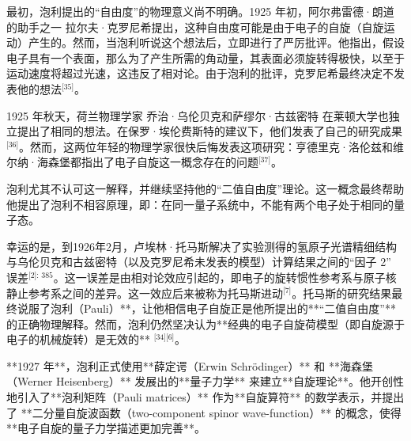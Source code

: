 最初，泡利提出的“自由度”的物理意义尚不明确。1925 年初，阿尔弗雷德·朗道的助手之一 拉尔夫·克罗尼希提出，这种自由度可能是由于电子的自旋（自旋运动）产生的。然而，当泡利听说这个想法后，立即进行了严厉批评。他指出，假设电子具有一个表面，那么为了产生所需的角动量，其表面必须旋转得极快，以至于运动速度将超过光速，这违反了相对论。由于泡利的批评，克罗尼希最终决定不发表他的想法\(^\text{[35]}\)。

1925 年秋天，荷兰物理学家 乔治·乌伦贝克和萨缪尔·古兹密特 在莱顿大学也独立提出了相同的想法。在保罗·埃伦费斯特的建议下，他们发表了自己的研究成果\(^\text{[36]}\)。然而，这两位年轻的物理学家很快后悔发表这项研究：亨德里克·洛伦兹和维尔纳·海森堡都指出了电子自旋这一概念存在的问题\(^\text{[37]}\)。  

泡利尤其不认可这一解释，并继续坚持他的“二值自由度”理论。这一概念最终帮助他提出了泡利不相容原理，即：在同一量子系统中，不能有两个电子处于相同的量子态。

幸运的是，到1926年2月，卢埃林·托马斯解决了实验测得的氢原子光谱精细结构与乌伦贝克和古兹密特（以及克罗尼希未发表的模型）计算结果之间的“因子 2” 误差\(^\text{[2]: 385}\)。这一误差是由相对论效应引起的，即电子的旋转惯性参考系与原子核静止参考系之间的差异。这一效应后来被称为托马斯进动\(^\text{[7]}\)。托马斯的研究结果最终说服了泡利（Pauli）**，让他相信电子自旋正是他所提出的**“二值自由度”** 的正确物理解释。然而，泡利仍然坚决认为**经典的电子自旋荷模型（即自旋源于电子的机械旋转）是无效的** \(^\text{[34][6]}\)。  

**1927 年**，泡利正式使用**薛定谔（Erwin Schrödinger）** 和 **海森堡（Werner Heisenberg）** 发展出的**量子力学** 来建立**自旋理论**。他开创性地引入了**泡利矩阵（Pauli matrices）** 作为**自旋算符** 的数学表示，并提出了 **二分量自旋波函数（two-component spinor wave-function）** 的概念，使得**电子自旋的量子力学描述更加完善**。